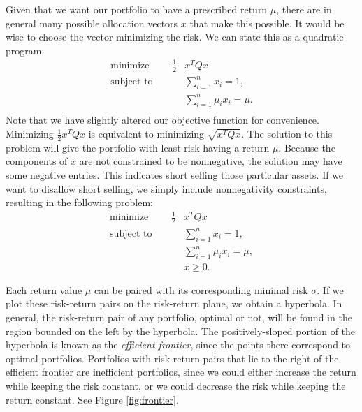Given that we want our portfolio to have a prescribed return $\mu$, there are in general many possible allocation vectors $x$
that make this possible. It would be wise to choose the vector minimizing the risk. We can state this as a quadratic program:
\begin{align*}
\text{minimize }\qquad \frac{1}{2}&x^TQx\\
\text{subject to }\qquad &\sum_{i=1}^n x_i = 1,\\
&\sum_{i=1}^n \mu_ix_i = \mu.\\
\end{align*}
Note that we have slightly altered our objective function for convenience. Minimizing $\frac{1}{2}x^TQx$ is equivalent
to minimizing $\sqrt{x^T Q x}$.
The solution to this problem will give the portfolio with least risk having a return $\mu$. Because the components of $x$
are not constrained to be nonnegative, the solution may have some negative entries. This indicates short selling those
particular assets. If we want to disallow short selling, we simply include nonnegativity constraints, resulting in the
following problem:
\begin{align*}
\text{minimize }\qquad \frac{1}{2}&x^TQx\\
\text{subject to }\qquad &\sum_{i=1}^n x_i = 1,\\
&\sum_{i=1}^n \mu_ix_i = \mu,\\
&x \geq 0.
\end{align*}

Each return value $\mu$ can be paired with its corresponding minimal risk $\sigma$. If we plot these risk-return pairs on the
risk-return plane, we obtain a hyperbola. In general, the risk-return pair of any portfolio, optimal or not, will be found
in the region bounded on the left by the hyperbola. The positively-sloped portion of the hyperbola is known as the
\emph{efficient frontier}, since the points there correspond to optimal portfolios. Portfolios with risk-return
pairs that lie to the right of the efficient frontier are inefficient portfolios, since we could either
increase the return while keeping the risk constant, or we could decrease the risk while keeping the return
constant. See Figure \ref{fig:frontier}.

